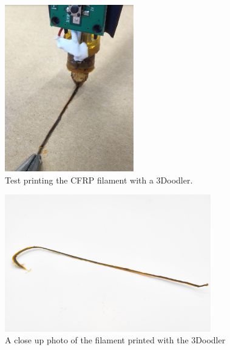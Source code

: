 \begin{figure}[htp]
    \centering
    \includegraphics[width=0.5\textwidth]{./figures/filament-print-3doodler-during}
    \caption{Test printing the CFRP filament with a 3Doodler.}
    \label{fig:filament-print-3doodler-during}
\end{figure}

\begin{figure}[htp]
    \centering
    \includegraphics[width=0.8\textwidth]{./figures/filament-extrude}
    \caption{A close up photo of the filament printed with the 3Doodler}
    \label{fig:filament-extrude}
\end{figure}